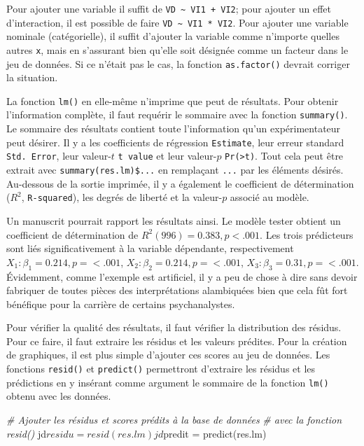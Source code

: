 \documentclass[
]{book}
\newenvironment{Shaded}{}{}
\newcommand{\CommentTok}[1]{\textit{#1}}
\newcommand{\FunctionTok}[1]{#1}
\newcommand{\NormalTok}[1]{#1}
\newcommand{\OtherTok}[1]{#1}
\newcommand{\SpecialCharTok}[1]{#1}
\begin{document}
Pour ajouter une variable il suffit de \texttt{VD\ \textasciitilde{}\ VI1\ +\ VI2}; pour ajouter un effet d'interaction, il est possible de faire \texttt{VD\ \textasciitilde{}\ VI1\ *\ VI2}. Pour ajouter une variable nominale (catégorielle), il suffit d'ajouter la variable comme n'importe quelles autres \texttt{x}, mais en s'assurant bien qu'elle soit désignée comme un facteur dans le jeu de données. Si ce n'était pas le cas, la fonction \texttt{as.factor()} devrait corriger la situation.

La fonction \texttt{lm()} en elle-même n'imprime que peut de résultats. Pour obtenir l'information complète, il faut requérir le sommaire avec la fonction \texttt{summary()}. Le sommaire des résultats contient toute l'information qu'un expérimentateur peut désirer. Il y a les coefficients de régression \texttt{Estimate}, leur erreur standard \texttt{Std.\ Error}, leur valeur-\(t\) \texttt{t\ value} et leur valeur-\(p\) \texttt{Pr(\textgreater{}\textbar{}t\textbar{})}. Tout cela peut être extrait avec \texttt{summary(res.lm)\$...} en remplaçant \texttt{...} par les éléments désirés. Au-dessous de la sortie imprimée, il y a également le coefficient de détermination (\(R^2\), \texttt{R-squared}), les degrés de liberté et la valeur-\(p\) associé au modèle.

Un manuscrit pourrait rapport les résultats ainsi. Le modèle tester obtient un coefficient de détermination de \(R^2(996) = 0.383, p < .001\). Les trois prédicteurs sont liés significativement à la variable dépendante, respectivement \(X_1: \beta_1 = 0.214, p = < .001\), \(X_2: \beta_2 = 0.214, p = < .001\), \(X_3: \beta_3 = 0.31, p = < .001\). Évidemment, comme l'exemple est artificiel, il y a peu de chose à dire sans devoir fabriquer de toutes pièces des interprétations alambiquées bien que cela fût fort bénéfique pour la carrière de certains psychanalystes.

Pour vérifier la qualité des résultats, il faut vérifier la distribution des résidus. Pour ce faire, il faut extraire les résidus et les valeurs prédites. Pour la création de graphiques, il est plus simple d'ajouter ces scores au jeu de données. Les fonctions \texttt{resid()} et \texttt{predict()} permettront d'extraire les résidus et les prédictions en y insérant comme argument le sommaire de la fonction \texttt{lm()} obtenu avec les données.

\begin{Shaded}
\begin{Highlighting}[]
\CommentTok{\# Ajouter les résidus et scores prédits à la base de données}
\CommentTok{\# avec la fonction \textasciigrave{}resid()\textasciigrave{}}
\NormalTok{jd}\SpecialCharTok{$}\NormalTok{residu }\OtherTok{=} \FunctionTok{resid}\NormalTok{(res.lm)}
\NormalTok{jd}\SpecialCharTok{$}\NormalTok{predit }\OtherTok{=} \FunctionTok{predict}\NormalTok{(res.lm)}
\end{Highlighting}
\end{Shaded}
\end{document}
